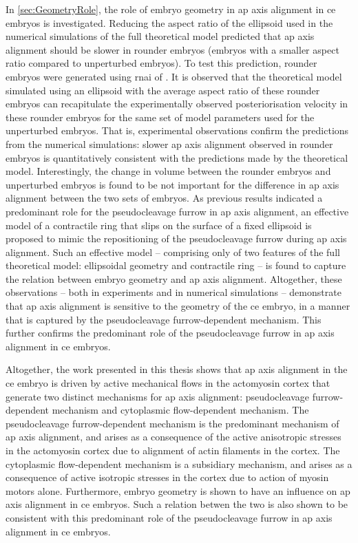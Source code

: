 In \autoref{sec:GeometryRole}, the role of embryo geometry in \ac{ap} axis alignment in \ac{ce} embryos is investigated. Reducing the aspect ratio of the ellipsoid used in the numerical simulations of the full theoretical model predicted that \ac{ap} axis alignment should be slower in rounder embryos (embryos with a smaller aspect ratio compared to unperturbed embryos). To test this prediction, rounder embryos were generated using \ac{rnai} of . It is observed that the theoretical model simulated using an ellipsoid with the average aspect ratio of these rounder embryos can recapitulate the experimentally observed posteriorisation velocity in these rounder embryos for the same set of model parameters used for the unperturbed embryos. That is, experimental observations confirm the predictions from the numerical simulations: slower \ac{ap} axis alignment observed in rounder embryos is quantitatively consistent with the predictions made by the theoretical model. Interestingly, the change in volume between the rounder embryos and unperturbed embryos is found to be not important for the difference in \ac{ap} axis alignment between the two sets of embryos. As previous results indicated a predominant role for the pseudocleavage furrow in \ac{ap} axis alignment, an effective model of a contractile ring that slips on the surface of a fixed ellipsoid is proposed to mimic the repositioning of the pseudocleavage furrow during \ac{ap} axis alignment. Such an effective model -- comprising only of two features of the full theoretical model: ellipsoidal geometry and contractile ring -- is found to capture the relation between embryo geometry and \ac{ap} axis alignment. Altogether, these observations -- both in experiments and in numerical simulations -- demonstrate that \ac{ap} axis alignment is sensitive to the geometry of the \ac{ce} embryo, in a manner that is captured by the pseudocleavage furrow-dependent mechanism. This further confirms the predominant role of the pseudocleavage furrow in \ac{ap} axis alignment in \ac{ce} embryos.

Altogether, the work presented in this thesis shows that \ac{ap} axis alignment in the \ac{ce} embryo is driven by active mechanical flows in the actomyosin cortex that generate two distinct mechanisms for \ac{ap} axis alignment: pseudocleavage furrow-dependent mechanism and cytoplasmic flow-dependent mechanism. The pseudocleavage furrow-dependent mechanism is the predominant mechanism of \ac{ap} axis alignment, and arises as a consequence of the active anisotropic stresses in the actomyosin cortex due to alignment of actin filaments in the cortex. The cytoplasmic flow-dependent mechanism is a subsidiary mechanism, and arises as a consequence of active isotropic stresses in the cortex due to action of myosin motors alone. Furthermore, embryo geometry is shown to have an influence on \ac{ap} axis alignment in \ac{ce} embryos. Such a relation betwen the two is also shown to be consistent with this predominant role of the pseudocleavage furrow in \ac{ap} axis alignment in \ac{ce} embryos.

